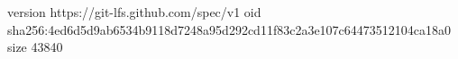 version https://git-lfs.github.com/spec/v1
oid sha256:4ed6d5d9ab6534b9118d7248a95d292cd11f83c2a3e107c64473512104ca18a0
size 43840
